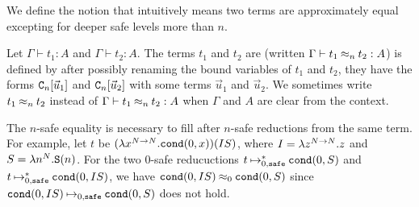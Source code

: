 We define the notion  that intuitively means
two terms are approximately equal excepting for deeper safe levels more than $n$. 

\begin{definition}
  Let $\Gamma\vdash t_1:A$ and $\Gamma\vdash t_2:A$. 
  The terms $t_1$ and $t_2$ are  (written $\Gamma \vdash t_1 \mathbin{\approx_{n}} t_2 : A$)
  is defined by after possibly renaming the bound variables of $t_1$ and $t_2$, 
  they have the forms ${\tt C}_{n}[\vec{u}_1]$ and ${\tt C}_{n}[\vec{u}_2]$
  with some terms $\vec{u}_1$ and $\vec{u}_2$.
  We sometimes write $t_1 \mathbin{\approx_{n}} t_2$ instead of $\Gamma \vdash t_1\mathbin{\approx_{n}} t_2:A$
  when $\Gamma$ and $A$ are clear from the context. 
\end{definition}

The $n$-safe equality is necessary to fill 
after $n$-safe reductions from the same term.
For example, let $t$ be $(\lambda x^{{N}\to{N}}.{\tt cond}(0,x))(IS)$,
where $I = \lambda z^{{N}\to{N}}.z$ and $S = \lambda n^{N}.{\tt S}(n)$.
For the two $0$-safe reducuctions 
$t \mathbin{\mathbin{\mapsto}_{0,{\hbox{\scriptsize \tt safe}}}^*} {\tt cond}(0,S)$ and $t \mathbin{\mathbin{\mapsto}_{0,{\hbox{\scriptsize \tt safe}}}^*} {\tt cond}(0,IS)$, 
we have ${\tt cond}(0,IS) \mathbin{\approx_{0}} {\tt cond}(0,S)$
since ${\tt cond}(0,IS) \mathbin{\mathbin{\mapsto}_{0,{\hbox{\scriptsize \tt safe}}}} {\tt cond}(0,S)$ does not hold. 

